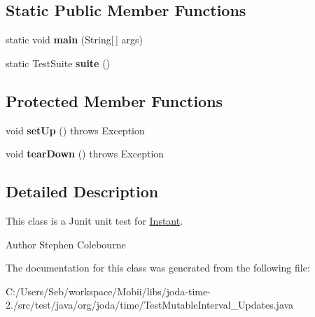 \subsection*{Static Public Member Functions}
\begin{DoxyCompactItemize}
\item 
\hypertarget{classorg_1_1joda_1_1time_1_1_test_mutable_interval___updates_a4e8bac60179863ea5b49e2430d9f6e5f}{static void {\bfseries main} (String\mbox{[}$\,$\mbox{]} args)}\label{classorg_1_1joda_1_1time_1_1_test_mutable_interval___updates_a4e8bac60179863ea5b49e2430d9f6e5f}

\item 
\hypertarget{classorg_1_1joda_1_1time_1_1_test_mutable_interval___updates_a47566364824a62ddaaf66eae26194010}{static Test\-Suite {\bfseries suite} ()}\label{classorg_1_1joda_1_1time_1_1_test_mutable_interval___updates_a47566364824a62ddaaf66eae26194010}

\end{DoxyCompactItemize}
\subsection*{Protected Member Functions}
\begin{DoxyCompactItemize}
\item 
\hypertarget{classorg_1_1joda_1_1time_1_1_test_mutable_interval___updates_a94c5f0df90c5e554c63590d555b2a4a9}{void {\bfseries set\-Up} ()  throws Exception }\label{classorg_1_1joda_1_1time_1_1_test_mutable_interval___updates_a94c5f0df90c5e554c63590d555b2a4a9}

\item 
\hypertarget{classorg_1_1joda_1_1time_1_1_test_mutable_interval___updates_a9d602d2252587d8a55b6390aebf4b9d8}{void {\bfseries tear\-Down} ()  throws Exception }\label{classorg_1_1joda_1_1time_1_1_test_mutable_interval___updates_a9d602d2252587d8a55b6390aebf4b9d8}

\end{DoxyCompactItemize}


\subsection{Detailed Description}
This class is a Junit unit test for \hyperlink{classorg_1_1joda_1_1time_1_1_instant}{Instant}.

\begin{DoxyAuthor}{Author}
Stephen Colebourne 
\end{DoxyAuthor}


The documentation for this class was generated from the following file\-:\begin{DoxyCompactItemize}
\item 
C\-:/\-Users/\-Seb/workspace/\-Mobii/libs/joda-\/time-\/2./src/test/java/org/joda/time/Test\-Mutable\-Interval\-\_\-\-Updates.\-java\end{DoxyCompactItemize}
